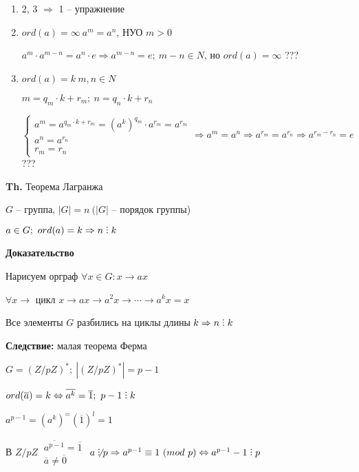 \documentclass[14pt, letter paper]{article}
\def\divby{%
  \mathrel{\text{\vbox{\baselineskip.65ex\lineskiplimit0pt\hbox{.}\hbox{.}\hbox{.}}}}%
}
\begin{document}
\begin{enumerate}
    \item 2, 3 $\Rightarrow$ 1 -- упражнение

    \item $ord(a) = \infty\ a^m = a^n$, НУО $m > 0$

    $a^m \cdot a^{m-n} = a^n \cdot e \Rightarrow a^{m-n} = e;\ m - n \in N$, но $ord(a) = \infty$ ???

    \item $ord(a) = k\ m,n \in N$

    $m = q_m \cdot k + r_m;\ n = q_n \cdot k + r_n$

    $\begin{cases}
        a^m = a^{q_m \cdot k + r_m} = (a^k)^{q_m} \cdot a^{r_m} = a^{r_m} \\
        a^n = a^{r_n} \\
        r_m = r_n
    \end{cases} \Rightarrow a^m = a^n \Rightarrow a^{r_m} = a^{r_n} \Rightarrow a^{r_m - r_n} = e$ ???
\end{enumerate}

\textbf{Th.} Теорема Лагранжа 

$G$ -- группа, $|G| = n\ (|G|$ -- порядок группы)

$a \in G;\ ord(a) = k \Rightarrow n \divby k$

\begin{center}
    \textbf{Доказательство}
\end{center}

Нарисуем орграф $\forall x \in G : x \rightarrow ax$

$\forall x \rightarrow$ цикл $x \rightarrow ax \rightarrow a^2x \rightarrow \cdots \rightarrow a^kx = x$

Все элементы $G$ разбились на циклы длины $k \Rightarrow n \divby k$

\textbf{Следствие:} малая теорема Ферма

$G = (Z/pZ)^*;\ |(Z/pZ)^*| = p - 1$

$ord(\overline{a}) = k \Leftrightarrow \overline{a^k} = \overline{1};\ p - 1 \divby k$

$a^{p-1} = (a^k)^ = (\overline{1})^l = 1$

В $Z/pZ\ \begin{gathered}
    \overline{a^{p-1}} = \overline{1} \\
    \overline{a} \neq \overline{0}
\end{gathered}$ $a \not\divby p \Rightarrow a^{p-1} \equiv 1\ (mod\ p) \Leftrightarrow a^{p-1} - 1 \divby p$
\end{document}
